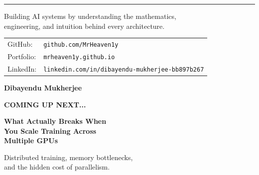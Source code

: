 \documentclass[11pt]{article}
\begin{document}
\vfill

\begin{center}

\rule{0.6\textwidth}{0.5pt}

\vspace{0.12in}

{\fontsize{11}{13}\selectfont\color{brandgray}
Building AI systems by understanding the mathematics,\\
engineering, and intuition behind every architecture.
}

\vspace{0.12in}

{\fontsize{10}{12}\selectfont\color{brandgray}
\begin{tabular}{@{}l l}
GitHub: & \texttt{github.com/MrHeaven1y} \\
Portfolio: & \texttt{mrheaven1y.github.io} \\
LinkedIn: & \texttt{linkedin.com/in/dibayendu-mukherjee-bb897b267}
\end{tabular}
}

\vspace{0.12in}

{\fontsize{14}{16}\selectfont\color{brandnavy}\textbf{Dibayendu Mukherjee}}

\end{center}

\vspace*{0.2in}



\thispagestyle{empty}
\vspace*{0.5in}

\begin{center}
    {\fontsize{14}{16}\selectfont\color{brandblue}\textbf{COMING UP NEXT...}}
    
    \vspace{0.4in}
    
    {\fontsize{32}{38}\selectfont\color{brandnavy}\bfseries
    What Actually Breaks When\\[0.15in]
    You Scale Training Across\\[0.15in]
    Multiple GPUs
    }
    
    \vspace{0.4in}
    
    \begin{minipage}{0.7\textwidth}
        \centering
        \color{brandgray}\fontsize{14}{18}\selectfont
        Distributed training, memory bottlenecks,\\
        and the hidden cost of parallelism.
    \end{minipage}
\end{center}
\end{document}
